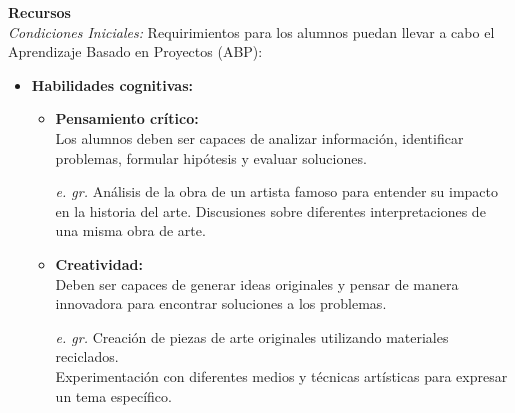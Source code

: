 {\large \textbf{Recursos}}\\
\textit{Condiciones Iniciales:} Requirimientos para los alumnos puedan llevar a cabo el Aprendizaje Basado en Proyectos (ABP):
\begin{itemize}
    \item \textbf{Habilidades cognitivas:}
    \begin{itemize}
        \item \textbf{Pensamiento crítico:}\\
        Los alumnos deben ser capaces de analizar información, identificar problemas, formular hipótesis y evaluar soluciones. 
        \item[\textit{e. gr.}] Análisis de la obra de un artista famoso para entender su impacto en la historia del arte. Discusiones sobre diferentes interpretaciones de una misma obra de arte.
        \item \textbf{Creatividad: }\\
        Deben ser capaces de generar ideas originales y pensar de manera innovadora para encontrar soluciones a los problemas.
        \item[\textit{e. gr.}]Creación de piezas de arte originales utilizando materiales reciclados. \\ Experimentación con diferentes medios y técnicas artísticas para expresar un tema específico.


\end{itemize}
\end{itemize}
